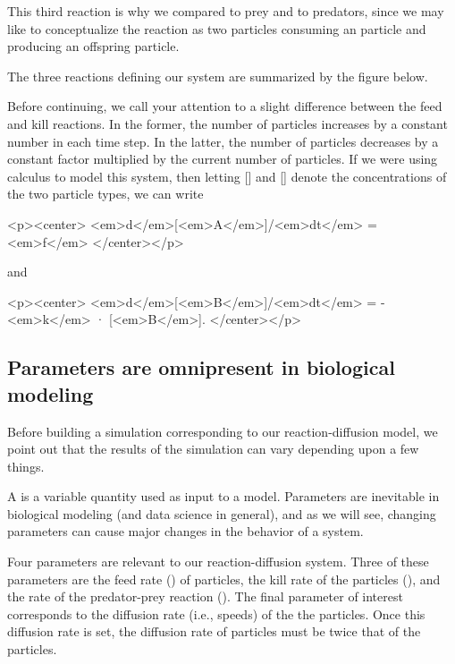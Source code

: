 This third reaction is why we compared  to prey and  to predators, since we may like to conceptualize the reaction as two  particles consuming an  particle and producing an offspring  particle.

The three reactions defining our system are summarized by the figure below.

{%

Before continuing, we call your attention to a slight difference between the feed and kill reactions. In the former, the number of  particles increases by a constant number in each time step. In the latter, the number of  particles decreases by a constant factor multiplied by the current number of  particles. If we were using calculus to model this system, then letting [] and [] denote the concentrations of the two particle types, we can write

<p><center>
<em>d</em>[<em>A</em>]/<em>dt</em> = <em>f</em>
</center></p>

and

<p><center>
<em>d</em>[<em>B</em>]/<em>dt</em> = -<em>k</em> · [<em>B</em>].
</center></p>

\FloatBarrier
{}
\subsection{Parameters are omnipresent in biological modeling}

Before building a simulation corresponding to our reaction-diffusion model, we point out that the results of the simulation can vary depending upon a few things.

A  is a variable quantity used as input to a model. Parameters are inevitable in biological modeling (and data science in general), and as we will see, changing parameters can cause major changes in the behavior of a system.

Four parameters are relevant to our reaction-diffusion system. Three of these parameters are the feed rate () of  particles, the kill rate of the  particles (), and the rate of the predator-prey reaction (). The final parameter of interest corresponds to the diffusion rate (i.e., speeds) of the the  particles. Once this diffusion rate is set, the diffusion rate of  particles must be twice that of the  particles.

}
